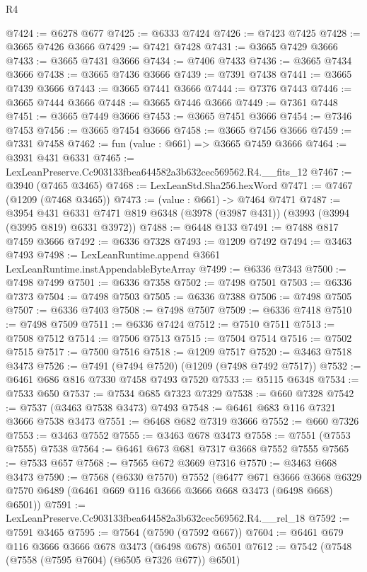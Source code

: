 \begin{lexlean}{R4}
\begin{coremodule}
@7424 := @6278 @677
@7425 := @6333 @7424
@7426 := @7423 @7425
@7428 := @3665 @7426 @3666
@7429 := @7421 @7428
@7431 := @3665 @7429 @3666
@7433 := @3665 @7431 @3666
@7434 := @7406 @7433
@7436 := @3665 @7434 @3666
@7438 := @3665 @7436 @3666
@7439 := @7391 @7438
@7441 := @3665 @7439 @3666
@7443 := @3665 @7441 @3666
@7444 := @7376 @7443
@7446 := @3665 @7444 @3666
@7448 := @3665 @7446 @3666
@7449 := @7361 @7448
@7451 := @3665 @7449 @3666
@7453 := @3665 @7451 @3666
@7454 := @7346 @7453
@7456 := @3665 @7454 @3666
@7458 := @3665 @7456 @3666
@7459 := @7331 @7458
@7462 := fun (value : @661) => @3665 @7459 @3666
@7464 := @3931 @431 @6331
@7465 := LexLeanPreserve.Cc903133fbea644582a3b632cec569562.R4.__fits_12
@7467 := @3940 (@7465 @3465)
@7468 := LexLeanStd.Sha256.hexWord
@7471 := @7467 (@1209 (@7468 @3465))
@7473 := (value : @661) -> @7464 @7471
@7487 := @3954
    @431
    @6331
    @7471
    @819
    @6348
    (@3978 (@3987 @431))
    (@3993 (@3994 (@3995 @819) @6331 @3972))
@7488 := @6448 @133
@7491 := @7488 @817 @7459 @3666
@7492 := @6336 @7328
@7493 := @1209 @7492
@7494 := @3463 @7493
@7498 := LexLeanRuntime.append @3661 LexLeanRuntime.instAppendableByteArray
@7499 := @6336 @7343
@7500 := @7498 @7499
@7501 := @6336 @7358
@7502 := @7498 @7501
@7503 := @6336 @7373
@7504 := @7498 @7503
@7505 := @6336 @7388
@7506 := @7498 @7505
@7507 := @6336 @7403
@7508 := @7498 @7507
@7509 := @6336 @7418
@7510 := @7498 @7509
@7511 := @6336 @7424
@7512 := @7510 @7511
@7513 := @7508 @7512
@7514 := @7506 @7513
@7515 := @7504 @7514
@7516 := @7502 @7515
@7517 := @7500 @7516
@7518 := @1209 @7517
@7520 := @3463 @7518 @3473
@7526 := @7491 (@7494 @7520) (@1209 (@7498 @7492 @7517))
@7532 := @6461 @686 @816 @7330 @7458 @7493 @7520
@7533 := @5115 @6348
@7534 := @7533 @650
@7537 := @7534 @685 @7323 @7329
@7538 := @660 @7328
@7542 := @7537 (@3463 @7538 @3473) @7493
@7548 := @6461 @683 @116 @7321 @3666 @7538 @3473
@7551 := @6468 @682 @7319 @3666
@7552 := @660 @7326
@7553 := @3463 @7552
@7555 := @3463 @678 @3473
@7558 := @7551 (@7553 @7555) @7538
@7564 := @6461 @673 @681 @7317 @3668 @7552 @7555
@7565 := @7533 @657
@7568 := @7565 @672 @3669 @7316
@7570 := @3463 @668 @3473
@7590 := @7568
    (@6330 @7570)
    @7552
    (@6477
      @671
      @3666
      @3668
      @6329
      @7570
      @6489
      (@6461 @669 @116 @3666 @3666 @668 @3473 (@6498 @668) @6501))
@7591 := LexLeanPreserve.Cc903133fbea644582a3b632cec569562.R4.__rel_18
@7592 := @7591 @3465
@7595 := @7564 (@7590 (@7592 @667))
@7604 := @6461 @679 @116 @3666 @3666 @678 @3473 (@6498 @678) @6501
@7612 := @7542 (@7548 (@7558 (@7595 @7604) (@6505 @7326 @677)) @6501)

\end{coremodule}
\end{lexlean}
